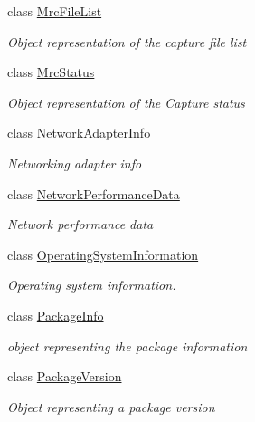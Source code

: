 \begin{DoxyCompactItemize}
class \hyperlink{class_microsoft_1_1_tools_1_1_windows_device_portal_1_1_device_portal_1_1_mrc_file_list}{Mrc\+File\+List}
\begin{DoxyCompactList}\small\item\em Object representation of the capture file list \end{DoxyCompactList}\item 
class \hyperlink{class_microsoft_1_1_tools_1_1_windows_device_portal_1_1_device_portal_1_1_mrc_status}{Mrc\+Status}
\begin{DoxyCompactList}\small\item\em Object representation of the Capture status \end{DoxyCompactList}\item 
class \hyperlink{class_microsoft_1_1_tools_1_1_windows_device_portal_1_1_device_portal_1_1_network_adapter_info}{Network\+Adapter\+Info}
\begin{DoxyCompactList}\small\item\em Networking adapter info \end{DoxyCompactList}\item 
class \hyperlink{class_microsoft_1_1_tools_1_1_windows_device_portal_1_1_device_portal_1_1_network_performance_data}{Network\+Performance\+Data}
\begin{DoxyCompactList}\small\item\em Network performance data \end{DoxyCompactList}\item 
class \hyperlink{class_microsoft_1_1_tools_1_1_windows_device_portal_1_1_device_portal_1_1_operating_system_information}{Operating\+System\+Information}
\begin{DoxyCompactList}\small\item\em Operating system information. \end{DoxyCompactList}\item 
class \hyperlink{class_microsoft_1_1_tools_1_1_windows_device_portal_1_1_device_portal_1_1_package_info}{Package\+Info}
\begin{DoxyCompactList}\small\item\em object representing the package information \end{DoxyCompactList}\item 
class \hyperlink{class_microsoft_1_1_tools_1_1_windows_device_portal_1_1_device_portal_1_1_package_version}{Package\+Version}
\begin{DoxyCompactList}\small\item\em Object representing a package version \end{DoxyCompactList}\item 

\end{DoxyCompactItemize}
